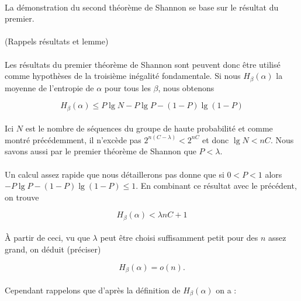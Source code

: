 	\paragraph{}La démonstration du second théorème de Shannon se base sur le résultat du premier. 
	
	\paragraph{}
	(Rappels résultats et lemme)
	
	\paragraph{}
	Les résultats du premier théorème de Shannon sont peuvent donc être utilisé comme hypothèses de la troisième inégalité fondamentale.
	Si nous $H_\beta(\alpha)$ la moyenne de l'entropie de $\alpha$ pour tous les $\beta$, nous obtenons
	
	\[H_\beta(\alpha)\le P\lg N - P\lg P - (1-P)\lg(1-P)\]
	
	\paragraph{}
	Ici $N$ est le nombre de séquences du groupe de haute probabilité et comme montré précédemment, il n'excède pas $2^{n(C-\lambda)}<2^{nC}$
	et donc $\lg N<nC$. Nous savons aussi par le premier théorème de Shannon que $P<\lambda$.
	
	\paragraph{}
	Un calcul assez rapide que nous détaillerons pas donne que si $0<P<1$ alors $-P\lg P -(1-P)\lg(1-P)\le 1$. En combinant ce résultat avec le précédent, on trouve
	
	\[H_\beta(\alpha) < \lambda nC + 1\]
	
	\paragraph{}
	À partir de ceci, vu que $\lambda$ peut être choisi suffisamment petit pour des $n$ assez grand, on déduit (préciser)
	
	\[H_\beta(\alpha)=o(n).\]
	
	\paragraph{}
	Cependant rappelons que d'après la définition de $H_\beta(\alpha)$ on a :
	
